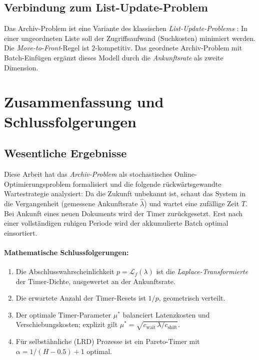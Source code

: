 ﻿\documentclass[12pt, a4paper]{article}
\begin{document}
\subsection{Verbindung zum List-Update-Problem}

Das Archiv-Problem ist eine Variante des klassischen \emph{List-Update-Problems}
\cite{sleator1985amortized}: In einer ungeordneten Liste soll der
Zugriffsaufwand (Suchkosten) minimiert werden. Die \emph{Move-to-Front}-Regel
ist $2$-kompetitiv. Das geordnete Archiv-Problem mit Batch-Einfügen ergänzt
dieses Modell durch die \emph{Ankunftsrate} als zweite Dimension.

\section{Zusammenfassung und Schlussfolgerungen}\label{sec:conclusion}

\subsection{Wesentliche Ergebnisse}

Diese Arbeit hat das \emph{Archiv-Problem} als stochastisches Online-Optimierungsproblem
formalisiert und die folgende rückwärtsgewandte Wartestrategie analysiert: Da die
Zukunft unbekannt ist, schaut das System in die Vergangenheit (gemessene
Ankunftsrate $\hat\lambda$) und wartet eine zufällige Zeit $T$. Bei Ankunft
eines neuen Dokuments wird der Timer zurückgesetzt. Erst nach einer vollständigen
ruhigen Periode wird der akkumulierte Batch optimal einsortiert.

\paragraph{Mathematische Schlussfolgerungen:}
\begin{enumerate}[label=\arabic*.,noitemsep]
  \item Die Abschlusswahrscheinlichkeit $p = \mathcal{L}_f(\lambda)$ ist die
        \emph{Laplace-Transformierte} der Timer-Dichte, ausgewertet an der
        Ankunftsrate.
  \item Die erwartete Anzahl der Timer-Resets ist $1/p$, geometrisch verteilt.
  \item Der optimale Timer-Parameter $\mu^*$ balanciert Latenzkosten und
        Verschiebungskosten; explizit gilt
        $\mu^* = \sqrt{c_{\mathrm{wait}}\,\lambda/c_{\mathrm{shift}}}$.
  \item Für selbstähnliche (LRD) Prozesse ist ein Pareto-Timer mit
        $\alpha = 1/(H-0.5) + 1$ optimal.
\end{enumerate}
\end{document}
